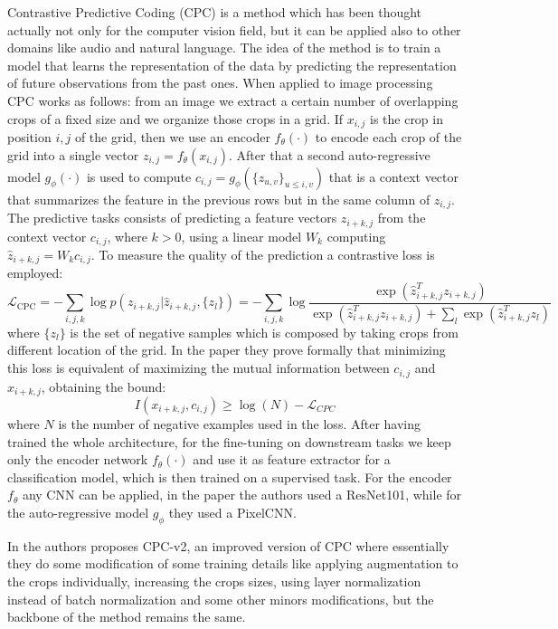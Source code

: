 Contrastive Predictive Coding (CPC) \cite{oord2018representation} is a method which has been thought actually not only for the computer vision field, but it can be applied also to other domains like audio and natural language. The idea of the method is to train a model that learns the representation of the data by predicting the representation of future observations from the past ones. When applied to image processing CPC works as follows: from an image we extract a certain number of overlapping crops of a fixed size and we organize those crops in a grid. If $x_{i,j}$ is the crop in position $i, j$ of the grid, then we use an encoder $f_\theta(\cdot)$ to encode each crop of the grid into a single vector $z_{i,j} = f_\theta(x_{i,j})$. After that a second auto-regressive model $g_\phi(\cdot)$ is used to compute $c_{i,j} = g_\phi(\{z_{u,v}\}_{u\le i, v})$ that is a context vector that summarizes the feature in the previous rows but in the same column of $z_{i,j}$. The predictive tasks consists of predicting a feature vectors $z_{i+k,j}$ from the context vector $c_{i,j}$, where $k > 0$, using a linear model $W_k$ computing $\hat{z}_{i+k,j} = W_kc_{i,j}$. To measure the quality of the prediction a contrastive loss is employed:
\[ \mathcal{L}_{\text{CPC}} = -\sum_{i,j,k}\log p(z_{i+k,j}|\hat{z}_{i+k,j}, \{z_l\}) = -\sum_{i,j,k}\log \frac{\exp(\hat{z}^T_{i+k,j}z_{i+k,j})}{\exp(\hat{z}^T_{i+k,j}z_{i+k,j}) + \sum_l \exp(\hat{z}^T_{i+k,j}z_l)}\]
where $\{z_l\}$ is the set of negative samples which is composed by taking crops from different location of the grid. In the paper they prove formally that minimizing this loss is equivalent of maximizing the mutual information between $c_{i,j}$ and $x_{i+k,j}$, obtaining the bound:
\[ I(x_{i+k,j}, c_{i,j}) \ge \log(N) - \mathcal{L}_{CPC}\]
where $N$ is the number of negative examples used in the loss. After having trained the whole architecture, for the fine-tuning on downstream tasks we keep only the encoder network $f_\theta(\cdot)$ and use it as feature extractor for a classification model, which is then trained on a supervised task. For the encoder $f_\theta$ any CNN can be applied, in the paper the authors used a ResNet101, while for the auto-regressive model $g_\phi$ they used a PixelCNN.

In \cite{henaff2020data} the authors proposes CPC-v2, an improved version of CPC where essentially they do some modification of some training details like applying augmentation to the crops individually, increasing the crops sizes, using layer normalization instead of batch normalization and some other minors modifications, but the backbone of the method remains the same.